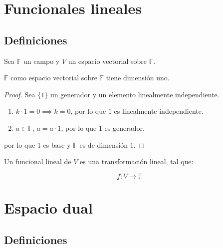 \newpage
\section{Funcionales lineales}

	\subsection{Definiciones}

		\begin{lema}
			Sea $\mathbb{F}$ un campo y $V$ un espacio vectorial sobre $\mathbb{F}$.

			$\mathbb{F}$ como espacio vectorial sobre $\mathbb{F}$ tiene dimensión uno.
		\end{lema}

		\begin{proof}
			Sea $\{1\}$ un generador y un elemento linealmente independiente.

			\begin{enumerate}
				\item $k \cdot 1 = 0 \implies k = 0$, por lo que $1$ es linealmente independiente.
				\item $a \in \mathbb{F}$, $a = a \cdot 1$, por lo que $1$ es generador.
			\end{enumerate}

			por lo que $1$ es base y $\mathbb{F}$ es de dimensión $1$.
		\end{proof}

		\begin{definicion}
			Un funcional lineal de $V$ es una transformación lineal, tal que:

			\begin{equation}
				f \colon V \to \mathbb{F}
			\end{equation}
		\end{definicion}

\newpage
\section{Espacio dual}

	\subsection{Definiciones}

